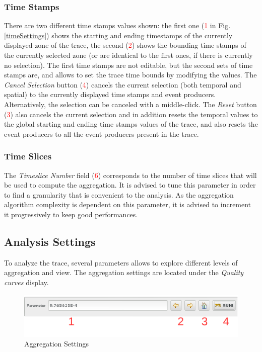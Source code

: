 \documentclass[twoside]{article}
\begin{document}
\begin{sloppypar}
\subsubsection{Time Stamps}
There are two different time stamps values shown: the first one (\textcolor{red}{1} in Fig. \ref{timeSettings}) shows the starting and ending timestamps of the currently displayed zone of the trace, the second (\textcolor{red}{2}) shows the bounding time stamps of the currently selected zone (or are identical to the first ones, if there is currently no selection). The first time stamps are not editable, but the second sets of time stamps are, and allows to set the trace time bounds by modifying the values. The \textit{Cancel Selection} button  (\textcolor{red}{4}) cancels the current selection (both temporal and spatial) to the currently displayed time stamps and event producers. Alternatively, the selection can be canceled with a middle-click. The \textit{Reset} button (\textcolor{red}{3}) also cancels the current selection and in addition resets the temporal values to the global starting and ending time stamps values of the trace, and also resets the event producers to all the event producers present in the trace.

\subsubsection{Time Slices}
The \textit{Timeslice Number} field (\textcolor{red}{6}) corresponds to the number of time slices that will be used to compute the aggregation. It is advised to tune this parameter in order to find a granularity that is convenient to the analysis. As the aggregation algorithm complexity is dependent on this parameter, it is advised to increment it progressively to keep good performances.

\subsection{Analysis Settings}
To analyze the trace, several parameters allows to explore  different levels of aggregation and view. The aggregation settings are located under the \textit{Quality curves} display.
 
\begin{figure}[h!]
	\centering
	\includegraphics[scale=1.0]{images/aggregationSettings.pdf}
	\caption{Aggregation Settings}
	\label{aggregSettings}
\end{figure}


\end{sloppypar}
\end{document}
